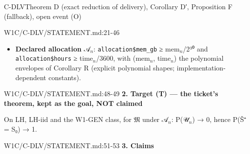 \begin{card}{C-DLV}{Theorem D (exact reduction of delivery), Corollary D′, Proposition F (fallback), open event (O)}
\begin{stmt}{W1C/C-DLV/STATEMENT.md:21-46}
\begin{itemize}
  \texttt{mem\_gb} and \texttt{hours} (the core silently substitutes 8 GiB / 24 h for missing names, \texttt{v3\_fit.R:19, :66-71}).
\item \textbf{Declared allocation} 𝒜$_{n}$: \texttt{allocation\$mem\_gb} ≥ mem$_{n}$/2³⁰ and \texttt{allocation\$hours} ≥ time$_{n}$/3600, with (mem$_{n}$,
  time$_{n}$) the polynomial envelopes of Corollary R (explicit polynomial shapes; implementation-dependent constants).
\end{itemize}
\end{stmt}
\begin{stmt}{W1C/C-DLV/STATEMENT.md:48-49}
\textbf{2. Target (T) — the ticket's theorem, kept as the goal, NOT claimed}

On LH, LH-iid and the W1-GEN class, for 𝔐 under 𝒜$_{n}$: P(𝒰$_{n}$) → 0, hence P(Ŝ⁺ = S₀) → 1.
\end{stmt}
\begin{stmt}{W1C/C-DLV/STATEMENT.md:51-53}
\textbf{3. Claims}


\end{stmt}
\end{card}
